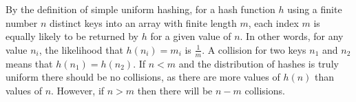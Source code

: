 By the definition of simple uniform hashing, for a hash function $ h $ using a finite number $ n $ distinct keys into an array with finite length $ m $, each index $ m $ is equally likely to be returned by $ h $ for a given value of $ n $. In other words, for any value $ n_i $, the likelihood that $ h(n_i) = m_i $ is $ \frac{1}{m} $. A collision for two keys $ n_1 $ and $ n_2 $ means that $ h(n_1) = h(n_2) $. If $ n < m $ and the distribution of hashes is truly uniform there should be no collisions, as there are more values of $ h(n) $ than values of $ n $. However, if $ n > m $ then there will be $ n - m $ collisions.